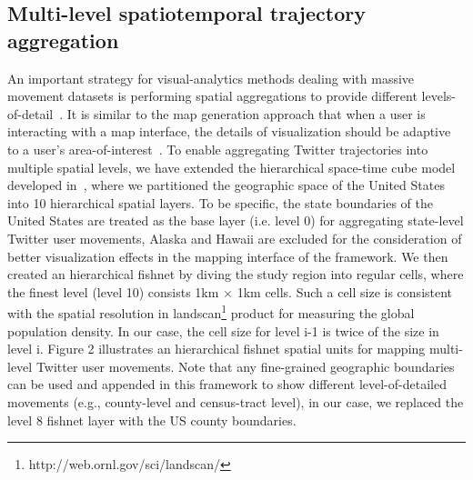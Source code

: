 \documentclass[ijgi,article,submit,moreauthors,pdftex,10pt,a4paper]{mdpi}
\theoremstyle{mdpi}
\newcounter{ex}
\newcounter{re}
\theoremstyle{mdpidefinition}
\begin{document}
\subsection{Multi-level spatiotemporal trajectory aggregation}
An important strategy for visual-analytics methods dealing with massive movement datasets is performing spatial aggregations to provide different levels-of-detail~\cite{andrienko2007designing,andrienko2007visual}.
It is similar to the map generation approach that when a user is interacting with a map interface, the details of visualization should be adaptive to a user's area-of-interest~\cite{buttenfield1991map}.
To enable aggregating Twitter trajectories into multiple spatial levels, we have extended the hierarchical space-time cube model developed in~\cite{cao2014scalable}, where we partitioned the geographic space of the United States into 10 hierarchical spatial layers. 
To be specific, the state boundaries of the United States are treated as the base layer (i.e. level 0) for aggregating state-level Twitter user movements, Alaska and Hawaii are excluded for the consideration of better visualization effects in the mapping interface of the framework. We then created an hierarchical fishnet by diving the study region into regular cells, where the finest level (level 10) consists 1km $\times$ 1km cells. Such a cell size is consistent with the spatial resolution in landscan\footnote{http://web.ornl.gov/sci/landscan/} product for measuring the global population density. In our case, the cell size for level i-1 is twice of the size in level i. Figure 2 illustrates an hierarchical fishnet spatial units for mapping multi-level Twitter user movements. Note that any fine-grained geographic boundaries can be used and appended in this framework to show different level-of-detailed movements (e.g., county-level and census-tract level), in our case, we replaced the level 8 fishnet layer with the US county boundaries.   
\end{document}
